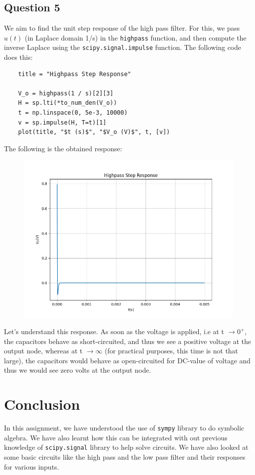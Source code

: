 \documentclass[12pt, a4paper]{article}
\newcommand{\code}{\lstinline[basicstyle=\small]}
\begin{document}
\subsection{Question 5}
We aim to find the unit step response of the high pass filter. For this, we pass $u(t)$ (in Laplace domain 1/s) in the \code{highpass} function, and then compute the inverse Laplace using the \code{scipy.signal.impulse} function.
The following code does this:

\begin{lstlisting}
    title = "Highpass Step Response"

    V_o = highpass(1 / s)[2][3]
    H = sp.lti(*to_num_den(V_o))
    t = np.linspace(0, 5e-3, 10000)
    v = sp.impulse(H, T=t)[1]
    plot(title, "$t (s)$", "$V_o (V)$", t, [v])
\end{lstlisting}

The following is the obtained response:
\begin{figure}[H]
    \centering
    \includegraphics[scale=0.6]{5.png}
\end{figure}

Let's understand this response. As soon as the voltage is applied, i.e at t $\rightarrow0^+$, the capacitors behave as short-circuited, and thus we see a positive voltage at the output node, whereas at t $\rightarrow\infty$ (for practical purposes, this time is not that large), the capacitors would behave as open-circuited for DC-value of voltage and thus we would see zero volts at the output node.

\section{Conclusion}
In this assignment, we have understood the use of \code{sympy} library to do symbolic algebra. We have also learnt how this can be integrated with out previous knowledge of \code{scipy.signal} library to help solve circuits. We have also looked at some basic circuits like the high pass and the low pass filter and their responses for various inputs.
\end{document}
